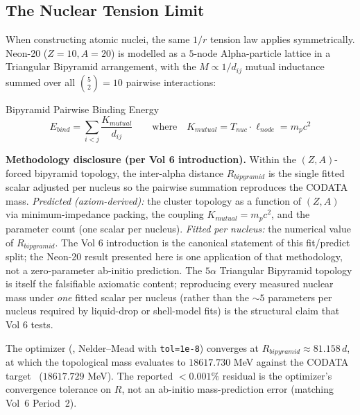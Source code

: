 \subsection{The Nuclear Tension Limit}
When constructing atomic nuclei, the same $1/r$ tension law applies symmetrically. Neon-20 ($Z=10, A=20$) is modelled as a $5$-node Alpha-particle lattice in a Triangular Bipyramid arrangement, with the $M \propto 1/d_{ij}$ mutual inductance summed over all $\binom{5}{2} = 10$ pairwise interactions:
\begin{resultbox}{Bipyramid Pairwise Binding Energy}
\begin{equation}
    E_{bind} = \sum_{i<j} \frac{K_{mutual}}{d_{ij}} \qquad \text{where} \quad K_{mutual} = T_{nuc} \cdot \ell_{node} = m_p c^2
\end{equation}
\end{resultbox}

\noindent\textbf{Methodology disclosure (per Vol 6 introduction).} Within the $(Z,A)$-forced bipyramid topology, the inter-alpha distance $R_{bipyramid}$ is the single fitted scalar adjusted per nucleus so the pairwise summation reproduces the CODATA mass. \emph{Predicted (axiom-derived):} the cluster topology as a function of $(Z, A)$ via minimum-impedance packing, the coupling $K_{mutual} = m_p c^2$, and the parameter count (one scalar per nucleus). \emph{Fitted per nucleus:} the numerical value of $R_{bipyramid}$. The Vol 6 introduction is the canonical statement of this fit/predict split; the Neon-20 result presented here is one application of that methodology, not a zero-parameter ab-initio prediction. The $5\alpha$ Triangular Bipyramid topology is itself the falsifiable axiomatic content; reproducing every measured nuclear mass under \emph{one} fitted scalar per nucleus (rather than the $\sim\!5$ parameters per nucleus required by liquid-drop or shell-model fits) is the structural claim that Vol 6 tests.

The optimizer (, Nelder--Mead with \texttt{tol=1e-8}) converges at $R_{bipyramid} \approx 81.158\,d$, at which the topological mass evaluates to $18617.730$ MeV against the CODATA target~\cite{codata2018} ($18617.729$ MeV). The reported $<0.001\%$ residual is the optimizer's convergence tolerance on $R$, not an ab-initio mass-prediction error (matching Vol~6 Period~2).

